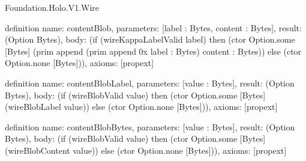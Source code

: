 \begin{lexlean}{Foundation.Holo.V1.Wire}
\begin{semanticmodule}
definition{
  name: contentBlob,
  parameters: [label : Bytes, content : Bytes],
  result: (Option Bytes),
  body: (if (wireKappaLabelValid label) then (ctor Option.some [Bytes] (prim append (prim append 0x label : Bytes) content : Bytes)) else (ctor Option.none [Bytes])),
  axioms: [propext]
}

definition{
  name: contentBlobLabel,
  parameters: [value : Bytes],
  result: (Option Bytes),
  body: (if (wireBlobValid value) then (ctor Option.some [Bytes] (wireBlobLabel value)) else (ctor Option.none [Bytes])),
  axioms: [propext]
}

definition{
  name: contentBlobBytes,
  parameters: [value : Bytes],
  result: (Option Bytes),
  body: (if (wireBlobValid value) then (ctor Option.some [Bytes] (wireBlobContent value)) else (ctor Option.none [Bytes])),
  axioms: [propext]
}
\end{semanticmodule}
\end{lexlean}
